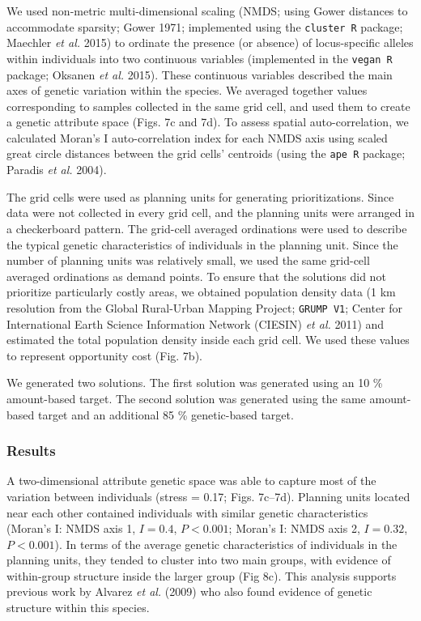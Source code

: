 We used non-metric multi-dimensional scaling (NMDS; using Gower
distances to accommodate sparsity; Gower 1971; implemented using the
\texttt{cluster R} package; Maechler \emph{et al.} 2015) to ordinate the
presence (or absence) of locus-specific alleles within individuals into
two continuous variables (implemented in the \texttt{vegan R} package;
Oksanen \emph{et al.} 2015). These continuous variables described the
main axes of genetic variation within the species. We averaged together
values corresponding to samples collected in the same grid cell, and
used them to create a genetic attribute space (Figs. 7c and 7d). To
assess spatial auto-correlation, we calculated Moran's I
auto-correlation index for each NMDS axis using scaled great circle
distances between the grid cells' centroids (using the \texttt{ape R}
package; Paradis \emph{et al.} 2004).

The grid cells were used as planning units for generating
prioritizations. Since data were not collected in every grid cell, and
the planning units were arranged in a checkerboard pattern. The
grid-cell averaged ordinations were used to describe the typical genetic
characteristics of individuals in the planning unit. Since the number of
planning units was relatively small, we used the same grid-cell averaged
ordinations as demand points. To ensure that the solutions did not
prioritize particularly costly areas, we obtained population density
data (1 km resolution from the Global Rural-Urban Mapping Project;
\texttt{GRUMP V1}; Center for International Earth Science Information
Network (CIESIN) \emph{et al.} 2011) and estimated the total population
density inside each grid cell. We used these values to represent
opportunity cost (Fig. 7b).

We generated two solutions. The first solution was generated using an 10
\% amount-based target. The second solution was generated using the same
amount-based target and an additional 85 \% genetic-based target.

\subsubsection{Results}\label{results-1}

A two-dimensional attribute genetic space was able to capture most of
the variation between individuals (stress = 0.17; Figs. 7c--7d).
Planning units located near each other contained individuals with
similar genetic characteristics (Moran's I: NMDS axis 1, \(I = 0.4\),
\(P < 0.001\); Moran's I: NMDS axis 2, \(I = 0.32\), \(P < 0.001\)). In
terms of the average genetic characteristics of individuals in the
planning units, they tended to cluster into two main groups, with
evidence of within-group structure inside the larger group (Fig 8c).
This analysis supports previous work by Alvarez \emph{et al.} (2009) who
also found evidence of genetic structure within this species.

